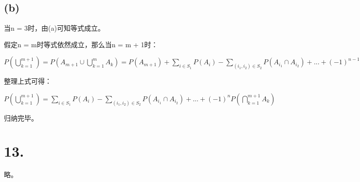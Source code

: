 \documentclass[UTF8]{article}
\begin{document}
        \subsection*{(b)}
            当n = 3时，由(a)可知等式成立。

            假定n = m时等式依然成立，那么当n = m + 1时：

            $P(\bigcup_{k = 1}^{m + 1}) = P(A_{m + 1} \cup \bigcup_{k = 1}^m A_k) = 
            P(A_{m + 1}) + \sum_{i \in S_1}P(A_i) 
            - \sum_{(i_1, i_2) \in S_2}P(A_{i_1} \cap A_{i_2}) + ... + (-1)^{n - 1}P(\bigcap_{k = 1}^{n}A_k) -
            P(A_{m + 1} \cap \bigcup_{k = 1}^m A_k)$

            整理上式可得：

            $P(\bigcup_{k = 1}^{m + 1}) = \sum_{i \in S_1}P(A_i) - \sum_{(i_1, i_2) \in S_2}P(A_{i_1} \cap A_{i_2}) + ... + (-1)^nP(\bigcap_{k = 1}^{m + 1}A_k)$

            归纳完毕。
    \section*{13.}
        略。
\end{document}
